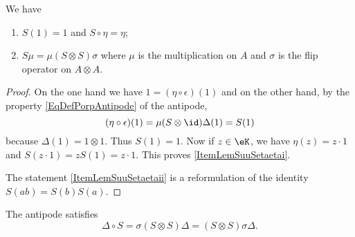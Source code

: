 \begin{lemma}       \label{LemSuuSetaeta}
    We have 
    \begin{enumerate}
        \item       \label{ItemLemSuuSetaetai}
            \( S(1)=1\) and \( S\circ\eta=\eta\);
        \item       \label{ItemLemSuuSetaetaii}
            \( S\mu=\mu(S\otimes S)\sigma\) where \( \mu\) is the multiplication on \( A\) and \( \sigma\) is the flip operator on \( A\otimes A\).
    \end{enumerate}
    
\end{lemma}

\begin{proof}
    On the one hand we have \( 1=(\eta\circ\epsilon)(1)\) and on the other hand, by the property \eqref{EqDefPorpAntipode} of the antipode,
    \begin{equation}
        (\eta\circ\epsilon)(1)=\mu(S\otimes \id)\Delta(1)=S(1)
    \end{equation}
    because \( \Delta(1)=1\otimes 1\). Thus \( S(1)=1\). Now if \( z\in\eK\), we have \( \eta(z)=z\cdot 1 \) and \( S(z\cdot 1)=zS(1)=z\cdot 1\). This proves \ref{ItemLemSuuSetaetai}.

    The statement \ref{ItemLemSuuSetaetaii} is a reformulation of the identity \( S(ab)=S(b)S(a)\).
\end{proof}

\begin{proposition}
    The antipode satisfies
    \begin{equation}
        \Delta\circ S=\sigma(S\otimes S)\Delta=(S\otimes S)\sigma\Delta.
    \end{equation}
\end{proposition}

